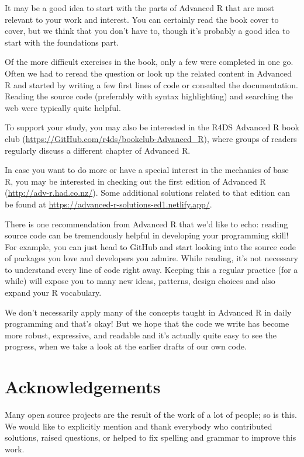 \documentclass[
]{krantz}
\renewcommand{\href}[2]{#2 (\url{#1})}
\begin{document}
It may be a good idea to start with the parts of Advanced R that are most relevant to your work and interest. You can certainly read the book cover to cover, but we think that you don't have to, though it's probably a good idea to start with the foundations part.

Of the more difficult exercises in the book, only a few were completed in one go. Often we had to reread the question or look up the related content in Advanced R and started by writing a few first lines of code or consulted the documentation. Reading the source code (preferably with syntax highlighting) and searching the web were typically quite helpful.

To support your study, you may also be interested in the \href{https://GitHub.com/r4ds/bookclub-Advanced_R}{R4DS Advanced R book club}, where groups of readers regularly discuss a different chapter of Advanced R.

In case you want to do more or have a special interest in the mechanics of base R, you may be interested in checking out the first edition of Advanced R (\url{http://adv-r.had.co.nz/}). Some additional solutions related to that edition can be found at \url{https://advanced-r-solutions-ed1.netlify.app/}.

There is one recommendation from Advanced R that we'd like to echo: reading source code can be tremendously helpful in developing your programming skill! For example, you can just head to GitHub and start looking into the source code of packages you love and developers you admire. While reading, it's not necessary to understand every line of code right away. Keeping this a regular practice (for a while) will expose you to many new ideas, patterns, design choices and also expand your R vocabulary.

We don't necessarily apply many of the concepts taught in Advanced R in daily programming and that's okay! But we hope that the code we write has become more robust, expressive, and readable and it's actually quite easy to see the progress, when we take a look at the earlier drafts of our own code.

\hypertarget{acknowledgements}{%
\section{Acknowledgements}\label{acknowledgements}}

Many open source projects are the result of the work of a lot of people; so is this. We would like to explicitly mention and thank everybody who contributed solutions, raised questions, or helped to fix spelling and grammar to improve this work.
\end{document}

